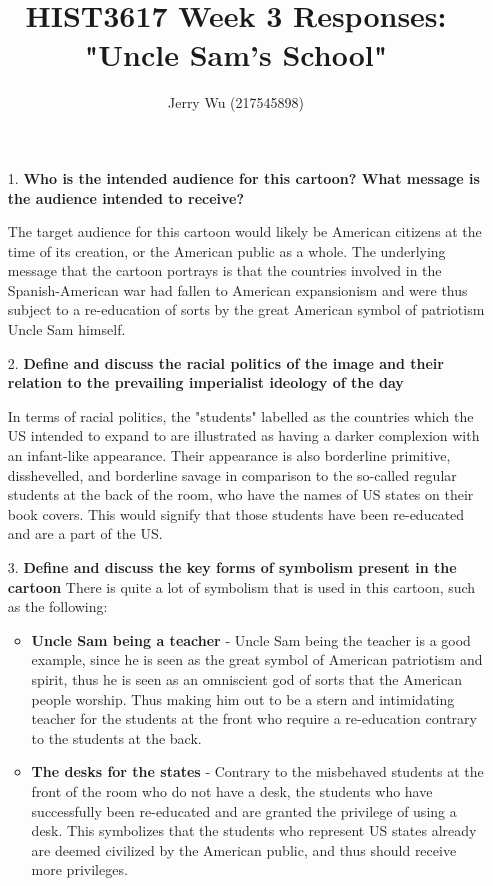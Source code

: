 \documentclass[12pt]{article}
\title{HIST3617 Week 3 Responses: "Uncle Sam's School"}
\author{Jerry Wu (217545898)}
\begin{document}
\maketitle

\begin{itemize}
    \item[1.] \textbf{Who is the intended audience for this cartoon? What message is the audience intended to receive?}
    
    The target audience for this cartoon would likely be American citizens at the time of its creation, or the American public as a whole. The underlying message that the cartoon portrays is that the countries involved in the Spanish-American war had fallen to American expansionism and were thus subject to a re-education of sorts by the great American symbol of patriotism Uncle Sam himself.

    \item[2.] \textbf{Define and discuss the racial politics of the image and their relation to the prevailing imperialist ideology of the day}
    
    In terms of racial politics, the "students" labelled as the countries which the US intended to expand to are illustrated as having a darker complexion with an infant-like appearance. Their appearance is also borderline primitive, disshevelled, and borderline savage in comparison to the so-called regular students at the back of the room, who have the names of US states on their book covers. This would signify that those students have been re-educated and are a part of the US.

    \item[3.] \textbf{Define and discuss the key forms of symbolism present in the cartoon}
    There is quite a lot of symbolism that is used in this cartoon, such as the following:
    \begin{itemize}
        \item \textbf{Uncle Sam being a teacher} - Uncle Sam being the teacher is a good example, since he is seen as the great symbol of American patriotism and spirit, thus he is seen as an omniscient god of sorts that the American people worship. Thus making him out to be a stern and intimidating teacher for the students at the front who require a re-education contrary to the students at the back.
        \item \textbf{The desks for the states} - Contrary to the misbehaved students at the front of the room who do not have a desk, the students who have successfully been re-educated and are granted the privilege of using a desk. This symbolizes that the students who represent US states already are deemed civilized by the American public, and thus should receive more privileges.
        
    \end{itemize} 
\end{itemize}
\end{document}
